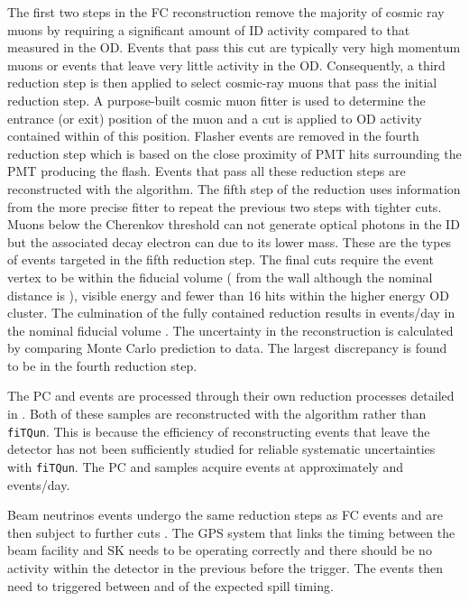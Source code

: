 The first two steps in the FC reconstruction remove the majority of cosmic ray muons by requiring a significant amount of ID activity compared to that measured in the OD. Events that pass this cut are typically very high momentum muons or events that leave very little activity in the OD. Consequently, a third reduction step is then applied to select cosmic-ray muons that pass the initial reduction step. A purpose-built cosmic muon fitter is used to determine the entrance (or exit) position of the muon and a cut is applied to OD activity contained within  of this position. Flasher events are removed in the fourth reduction step which is based on the close proximity of PMT hits surrounding the PMT producing the flash. Events that pass all these reduction steps are reconstructed with the \apfit algorithm. The fifth step of the reduction uses information from the more precise fitter to repeat the previous two steps with tighter cuts. Muons below the Cherenkov threshold can not generate optical photons in the ID but the associated decay electron can due to its lower mass. These are the types of events targeted in the fifth reduction step. The final cuts require the event vertex to be within the fiducial volume ( from the wall although the nominal distance is ), visible energy  and fewer than 16 hits within the higher energy OD cluster. The culmination of the fully contained reduction results in  events/day in the nominal fiducial volume \cite{thesis_miao}. The uncertainty in the reconstruction is calculated by comparing Monte Carlo prediction to data. The largest discrepancy is found to be  in the fourth reduction step.

The PC and  events are processed through their own reduction processes detailed in \cite{Ashie_2005}. Both of these samples are reconstructed with the \apfit algorithm rather than \texttt{fiTQun}. This is because the efficiency of reconstructing events that leave the detector has not been sufficiently studied for reliable systematic uncertainties with \texttt{fiTQun}. The PC and  samples acquire events at approximately  and  events/day.

Beam neutrinos events undergo the same reduction steps as FC events and are then subject to further cuts \cite{t2k_tn_027}. The GPS system that links the timing between the beam facility and SK needs to be operating correctly and there should be no activity within the detector in the previous  before the trigger. The events then need to triggered between  and  of the expected spill timing.

